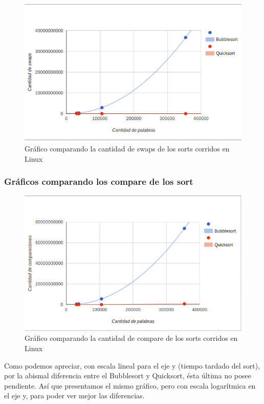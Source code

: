 \documentclass[a4paper,10pt]{article}
\begin{document}
\begin{figure}[h!]
	\centering
	\includegraphics[scale=0.7]{./recursos/swapVsPala.png}
	\caption{Gr\'afico comparando la cantidad de swaps de los sorts corridos en Linux}
\end{figure}

\subsubsection{Gr\'aficos comparando los compare de los sort}

\begin{figure}[h!]
	\centering
	\includegraphics[scale=0.7]{./recursos/compareVsPala.png}
	\caption{Gr\'afico comparando la cantidad de compare de los sorts corridos en Linux}
\end{figure}

\bigskip
Como podemos apreciar, con escala lineal para el eje y (tiempo tardado del sort), por la abismal diferencia entre el Bubblesort y Quicksort, \'esta \'ultima no posee pendiente. As\'i que presentamos el mismo gr\'afico, pero con escala logar\'itmica en el eje y, para poder ver mejor las diferencias.
\end{document}
